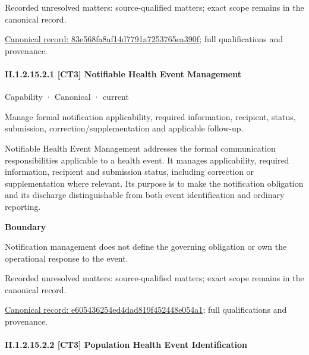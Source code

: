 {\small Recorded unresolved matters: source-qualified matters; exact scope remains in the canonical record.}\par
{\footnotesize \href{../../../../continuum/strategy/capability/83e568fa8af14d7791a7253765ea390f.md}{Canonical record: 83e568fa8af14d7791a7253765ea390f}; full qualifications and provenance.}\par
\paragraph*{II.1.2.15.2.1 [CT3] Notifiable Health Event Management}
\label{navigation:II.1.2.15.2.1}

\label{element:e605436254ed4dad819f452448e054a1}
{\small Capability · Canonical · current}\par

Manage formal notification applicability, required information, recipient, status, submission, correction/supplementation and applicable follow-up.



Notifiable Health Event Management addresses the formal communication responsibilities applicable to a health event. It manages applicability, required information, recipient and submission status, including correction or supplementation where relevant. Its purpose is to make the notification obligation and its discharge distinguishable from both event identification and ordinary reporting.



\textbf{Boundary}



Notification management does not define the governing obligation or own the operational response to the event.


{\small Recorded unresolved matters: source-qualified matters; exact scope remains in the canonical record.}\par
{\footnotesize \href{../../../../continuum/strategy/capability/e605436254ed4dad819f452448e054a1.md}{Canonical record: e605436254ed4dad819f452448e054a1}; full qualifications and provenance.}\par
\paragraph*{II.1.2.15.2.2 [CT3] Population Health Event Identification}
\label{navigation:II.1.2.15.2.2}

